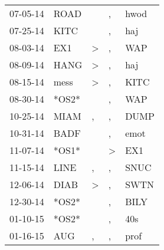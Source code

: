\begin{supertabular}{p{0.07\textwidth}p{0.06\textwidth}p{0.02\textwidth}p{0.02\textwidth}p{0.06\textwidth}}
          07-05-14\textsuperscript{} &           ROAD\textsuperscript{} &                  &             , &  hwod\textsuperscript{} \\
          07-25-14\textsuperscript{} &           KITC\textsuperscript{} &                  &             , &   haj\textsuperscript{} \\
          08-03-14\textsuperscript{} &            EX1\textsuperscript{} &     \textgreater &             , &   WAP\textsuperscript{} \\
          08-09-14\textsuperscript{} &           HANG\textsuperscript{} &     \textgreater &             , &   haj\textsuperscript{} \\
          08-15-14\textsuperscript{} &           mess\textsuperscript{} &     \textgreater &             , &  KITC\textsuperscript{} \\
          08-30-14\textsuperscript{} &                            *OS2* &                  &             , &   WAP\textsuperscript{} \\
          10-25-14\textsuperscript{} &           MIAM\textsuperscript{} &                , &             , &  DUMP\textsuperscript{} \\
          10-31-14\textsuperscript{} &           BADF\textsuperscript{} &                  &             , &  emot\textsuperscript{} \\
          11-07-14\textsuperscript{} &                            *OS1* &                  &  \textgreater &   EX1\textsuperscript{} \\
          11-15-14\textsuperscript{} &           LINE\textsuperscript{} &                , &             , &  SNUC\textsuperscript{} \\
          12-06-14\textsuperscript{} &           DIAB\textsuperscript{} &     \textgreater &             , &  SWTN\textsuperscript{} \\
          12-30-14\textsuperscript{} &                            *OS2* &                  &             , &  BILY\textsuperscript{} \\
          01-10-15\textsuperscript{} &                            *OS2* &                  &             , &   40s\textsuperscript{} \\
          01-16-15\textsuperscript{} &            AUG\textsuperscript{} &                , &             , &  prof\textsuperscript{} \\

\end{supertabular}
